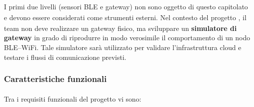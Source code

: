 \documentclass[a4paper,11pt]{article}
\begin{document}
\paragraph{} 
I primi due livelli (sensori BLE e gateway) non sono oggetto di questo capitolato\textsubscript{}
 e devono essere considerati come strumenti esterni. 
Nel contesto del progetto\textsubscript{}
, il team non deve realizzare un gateway fisico, ma sviluppare un \textbf{simulatore di gateway} 
in grado di riprodurre in modo verosimile il comportamento di un nodo BLE--WiFi. 
Tale simulatore sarà utilizzato per validare l'infrastruttura cloud e testare i flussi di comunicazione previsti.


\subsubsection{Caratteristiche funzionali\textsubscript{}
}
Tra i requisiti\textsubscript{}
 funzionali\textsubscript{}
 del progetto\textsubscript{}
 vi sono:
\end{document}
